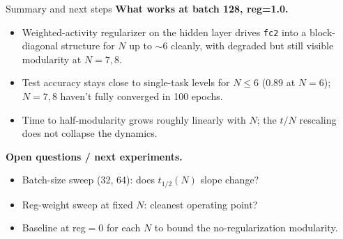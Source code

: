 \documentclass[aspectratio=169]{beamer}
\newcommand{\code}[1]{\texttt{\small #1}}
\begin{document}
\begin{frame}{Summary and next steps}
  \textbf{What works at batch 128, reg=1.0.}
  \begin{itemize}\setlength\itemsep{2pt}
    \item Weighted-activity regularizer on the hidden layer drives
      \code{fc2} into a block-diagonal structure for $N$ up to $\sim$6
      cleanly, with degraded but still visible modularity at $N{=}7, 8$.
    \item Test accuracy stays close to single-task levels for $N{\le}6$
      (0.89 at $N{=}6$); $N{=}7,8$ haven't fully converged in 100 epochs.
    \item Time to half-modularity grows roughly linearly with $N$; the
      $t/N$ rescaling does not collapse the dynamics.
  \end{itemize}
  \medskip
  \textbf{Open questions / next experiments.}
  \begin{itemize}\setlength\itemsep{2pt}
    \item Batch-size sweep (32, 64): does $t_{1/2}(N)$ slope change?
    \item Reg-weight sweep at fixed $N$: cleanest operating point?
    \item Baseline at reg$=$0 for each $N$ to bound the
      no-regularization modularity.
  \end{itemize}
\end{frame}
\end{document}
